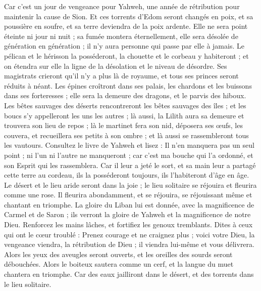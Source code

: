 \begin{multicols}{2}
Car c'est un jour de vengeance pour Yahweh, une année de rétribution pour maintenir la cause de Sion.
Et ces torrents d'Edom seront changés en poix, et sa poussière en soufre, et sa terre deviendra de la poix ardente.
Elle ne sera point éteinte ni jour ni nuit ; sa fumée montera éternellement, elle sera désolée de génération en génération ; il n'y aura personne qui passe par elle à jamais.
Le pélican et le hérisson la posséderont, la chouette et le corbeau y habiteront ; et on étendra sur elle la ligne de la désolation et le niveau de désordre.
Ses magistrats crieront qu'il n'y a plus là de royaume, et tous ses princes seront réduits à néant.
Les épines croîtront dans ses palais, les chardons et les buissons dans ses forteresses ; elle sera la demeure des dragons, et le parvis des hiboux.
Les bêtes sauvages des déserts rencontreront les bêtes sauvages des îles ; et les boucs s'y appelleront les uns les autres ; là aussi, la Lilith aura sa demeure et trouvera son lieu de repos ;
là le martinet fera son nid, déposera ses œufs, les couvera, et recueillera ses petits à son ombre ; et là aussi se rassembleront tous les vautours.
Consultez le livre de Yahweh et lisez : Il n'en manquera pas un seul point ; ni l'un ni l'autre ne manqueront ; car c'est ma bouche qui l'a ordonné, et son Esprit qui les rassemblera.
Car il leur a jeté le sort, et sa main leur a partagé cette terre au cordeau, ils la posséderont toujours, ils l'habiteront d'âge en âge.
\VerseOne{}Le désert et le lieu aride seront dans la joie ; le lieu solitaire se réjouira et fleurira comme une rose.
Il fleurira abondamment, et se réjouira, se réjouissant même et chantant en triomphe. La gloire du Liban lui est donnée, avec la magnificence de Carmel et de Saron ; ils verront la gloire de Yahweh et la magnificence de notre Dieu.
Renforcez les mains lâches, et fortifiez les genoux tremblants.
Dites à ceux qui ont le cœur troublé : Prenez courage et ne craignez plus ; voici votre Dieu, la vengeance viendra, la rétribution de Dieu ; il viendra lui-même et vous délivrera.
Alors les yeux des aveugles seront ouverts, et les oreilles des sourds seront débouchées.
Alors le boiteux sautera comme un cerf, et la langue du muet chantera en triomphe. Car des eaux jailliront dans le désert, et des torrents dans le lieu solitaire.

\end{multicols}
